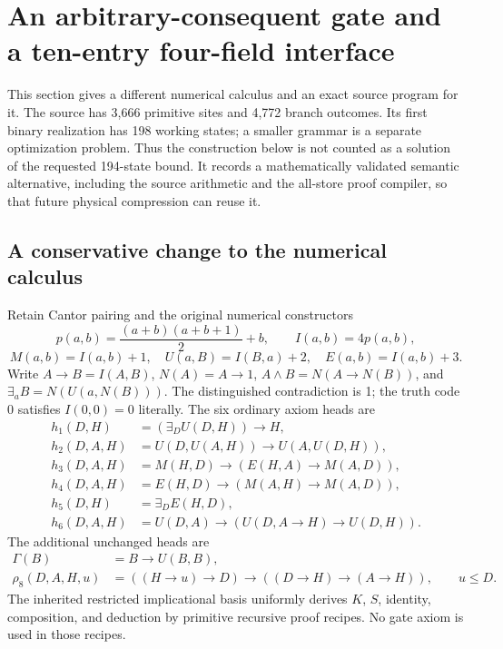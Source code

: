 \section{An arbitrary-consequent gate and a ten-entry four-field interface}
\label{sec:gate-x}

This section gives a different numerical calculus and an exact source program
for it.  The source has 3,666 primitive sites and 4,772 branch outcomes.
Its first binary realization has 198 working states; a smaller grammar is a
separate optimization problem.  Thus the construction below is not counted as
a solution of the requested 194-state bound.  It records a mathematically
validated semantic alternative, including the source arithmetic and the
all-store proof compiler, so that future physical compression can reuse it.

\subsection{A conservative change to the numerical calculus}

Retain Cantor pairing and the original numerical constructors
\[
 p(a,b)=\frac{(a+b)(a+b+1)}2+b,\qquad I(a,b)=4p(a,b),
\]
\[
 M(a,b)=I(a,b)+1,\quad U(a,B)=I(B,a)+2,\quad E(a,b)=I(a,b)+3.
\]
Write $A\to B=I(A,B)$, $N(A)=A\to1$,
$A\wedge B=N(A\to N(B))$, and $\exists_a B=N(U(a,N(B)))$.
The distinguished contradiction is 1; the truth code 0 satisfies
$I(0,0)=0$ literally.  The six ordinary axiom heads are
\begin{align*}
 h_1(D,H)&=(\exists_D U(D,H))\to H,\\
 h_2(D,A,H)&=U(D,U(A,H))\to U(A,U(D,H)),\\
 h_3(D,A,H)&=M(H,D)\to(E(H,A)\to M(A,D)),\\
 h_4(D,A,H)&=E(H,D)\to(M(A,H)\to M(A,D)),\\
 h_5(D,H)&=\exists_D E(H,D),\\
 h_6(D,A,H)&=U(D,A)\to(U(D,A\to H)\to U(D,H)).
\end{align*}
The additional unchanged heads are
\[
 \begin{aligned}
 \Gamma(B)&=B\to U(B,B),\\
 \rho_8(D,A,H,u)&=((H\to u)\to D)\to((D\to H)\to(A\to H)),
 \qquad u\le D.
\end{aligned}
\]
The inherited restricted implicational basis uniformly derives $K$, $S$,
identity, composition, and deduction by primitive recursive proof recipes.
No gate axiom is used in those recipes.

